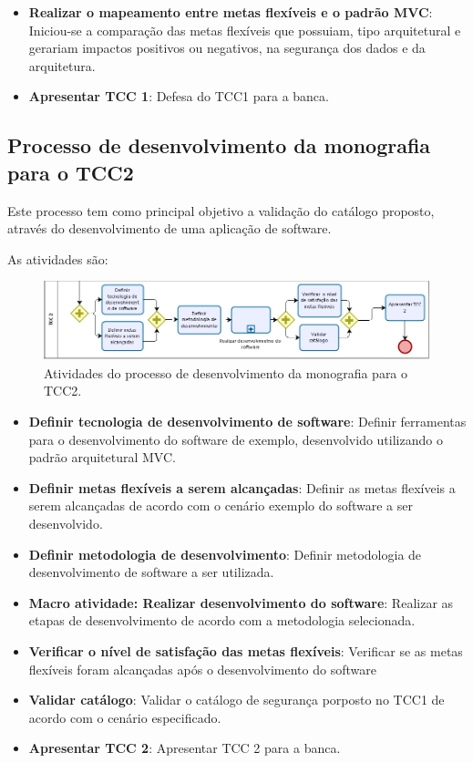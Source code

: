 \begin{itemize}
	\item \textbf{Realizar o mapeamento entre metas flexíveis e o padrão MVC}: Iniciou-se a comparação das metas flexíveis que possuiam, tipo arquitetural e gerariam impactos positivos ou negativos, na segurança dos dados e da arquitetura. 
	
	\item \textbf{Apresentar TCC 1}: Defesa do TCC1 para a banca. 
\end{itemize}

\subsection{Processo de desenvolvimento da monografia para o TCC2}

Este processo tem como principal objetivo a validação do catálogo proposto, através do desenvolvimento de uma aplicação de software. 

As atividades são:

\begin{figure}[h!]
	\centering
	\includegraphics[keepaspectratio=true,scale=0.7]{figuras/PDM-TCC2.PNG}
	\caption{Atividades do processo de desenvolvimento da monografia para o TCC2.}
	\label{PDM-TCC2}
\end{figure}

\begin{itemize}
	\item \textbf{Definir tecnologia de desenvolvimento de software}: Definir ferramentas para o desenvolvimento do software de exemplo, desenvolvido utilizando o padrão arquitetural MVC.
	
	\item \textbf{Definir metas flexíveis a serem alcançadas}: Definir as metas flexíveis a serem alcançadas de acordo com o cenário exemplo do software a ser desenvolvido.
	
	\item \textbf{Definir metodologia de desenvolvimento}: Definir metodologia de desenvolvimento de software a ser utilizada.  
	
	\item \textbf{Macro atividade: Realizar desenvolvimento do software}: Realizar as etapas de desenvolvimento de acordo com a metodologia selecionada.
	
	\item \textbf{Verificar o nível de satisfação das metas flexíveis}: Verificar se as metas flexíveis foram alcançadas após o desenvolvimento do software
	
	\item \textbf{Validar catálogo}: Validar o catálogo de segurança porposto no TCC1 de acordo com o cenário especificado. 
	
	\item \textbf{Apresentar TCC 2}: Apresentar TCC 2 para a banca.
\end{itemize}

